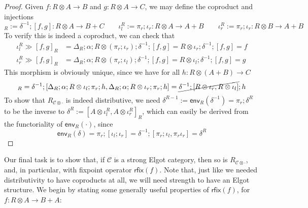 \documentclass[acmsmall,screen,review]{acmart}
\newcommand{\mc}[1]{\ensuremath{\mathcal{#1}}}
\newcommand{\ms}[1]{\ensuremath{\mathsf{#1}}}
\newcommand{\dmor}[1]{{\Delta}_{#1}}
\newcommand{\envcom}[2]{{#1}_{#2 \otimes \cdot}}
\newcommand{\rfix}[1]{\ms{rfix}(#1)}
\newcommand{\rseq}[3]{#2 \gg_{#1} #3}
\newcommand{\toenv}[2]{\ms{env}_{#1}(#2)}
\newcommand{\envcop}[3]{[#2, #3]_{#1}}
\newcommand{\envinr}[1]{\iota^{#1}_{r}}
\newcommand{\envinl}[1]{\iota^{#1}_{l}}
\begin{document}
\begin{proof}
  Given $f : R \otimes A \to B$ and $g : R \otimes A \to C$, we may define the coproduct and
  injections
  \begin{equation}
    \envcop{R}{f}{g} := \delta^{-1} ; [f, g] : R \otimes A \to B + C \qquad
    \envinl{R} := \pi_r ; \iota_r : R \otimes A \to A + B \qquad
    \envinr{R} := \pi_r ; \iota_r : R \otimes B \to A + B
  \end{equation}
  To verify this is indeed a coproduct, we can check that
  \begin{equation}
    \begin{aligned}
    \rseq{}{\envinl{R}}{\envcop{R}{f}{g}} 
      &= \dmor{R} ; \alpha ; R \otimes (\pi_r ; \iota_r) ; \delta^{-1} ; [f, g]
      = R \otimes \iota_r ; \delta^{-1} ; [f, g]
      = f \\
    \rseq{}{\envinr{R}}{\envcop{R}{f}{g}} 
    &= \dmor{R} ; \alpha ; R \otimes (\pi_r ; \iota_l) ; \delta^{-1} ; [f, g]
    = R \otimes \iota_l ; \delta^{-1} ; [f, g]
    = g
    \end{aligned}
  \end{equation}
  This morphism is obviously unique, since we have for all $h : R \otimes (A + B) \to C$
  \begin{equation}
    \envcop{R}{\rseq{}{\envinl{R}}{h}}{\rseq{}{\envinr{R}}{h}}
    = \delta^{-1} 
    ; [\dmor{R} ; \alpha ; R \otimes \iota_l ; \pi_r ; h,
      \dmor{R} ; \alpha ; R \otimes \iota_r ; \pi_r ; h]
    = \cancel{\delta^{-1} ; [R \otimes \iota_r, R \otimes \iota_l]} ; h
  \end{equation}
  To show that $\envcom{R}{\mc{C}}$ is indeed distributive, we need $\delta^{R-1} :=
  \toenv{R}{\delta^{-1}} = \pi_r ; \delta^R$ to be the inverse to $\delta^R := \envcop{R}{A \otimes
  \envinl{R}}{A \otimes \envinr{R}}$, which can easily be derived from the functoriality of
  $\toenv{R}{\cdot}$, since
  \begin{equation}
    \toenv{R}{\delta} = \pi_r ; [\iota_l ; \iota_r] 
                      = \delta^{-1} ; [\pi_r ; \iota_l, \pi_r \iota_r]
                      = \delta^R
  \end{equation}
\end{proof}
Our final task is to show that, if $\mc{C}$ is a strong Elgot category, then so is
$\envcom{R}{\mc{C}}$, and, in particular, with fixpoint operator $\rfix{f}$. Note that, just like we
needed distributivity to have coproducts at all, we will need strength to have an Elgot structure.
We begin by stating some generally useful properties of $\rfix{f}$, for $f : R \otimes A \to B + A$:
\end{document}
